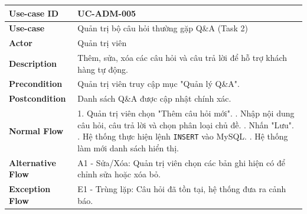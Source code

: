 \begin{table}[H]
\centering
\renewcommand{\arraystretch}{1.2}
\begin{tabular}{|p{3.5cm}|p{9.5cm}|}
\hline
\textbf{Use-case ID} & UC-ADM-005 \\ \hline
\textbf{Use-case} & Quản trị bộ câu hỏi thường gặp Q\&A (Task 2) \\ \hline
\textbf{Actor} & Quản trị viên \\ \hline
\textbf{Description} & Thêm, sửa, xóa các câu hỏi và câu trả lời để hỗ trợ khách hàng tự động. \\ \hline
\textbf{Precondition} & Quản trị viên truy cập mục "Quản lý Q\&A". \\ \hline
\textbf{Postcondition} & Danh sách Q\&A được cập nhật chính xác. \\ \hline
\textbf{Normal Flow} & 
1. Quản trị viên chọn "Thêm câu hỏi mới". \newline
2. Nhập nội dung câu hỏi, câu trả lời và chọn phân loại chủ đề. \newline
3. Nhấn "Lưu". \newline
4. Hệ thống thực hiện lệnh \texttt{INSERT} vào MySQL. \newline
5. Hệ thống làm mới danh sách hiển thị. \\ \hline
\textbf{Alternative Flow} & A1 - Sửa/Xóa: Quản trị viên chọn các bản ghi hiện có để chỉnh sửa hoặc xóa bỏ. \\ \hline
\textbf{Exception Flow} & E1 - Trùng lặp: Câu hỏi đã tồn tại, hệ thống đưa ra cảnh báo. \\ \hline
\end{tabular}
\end{table}

